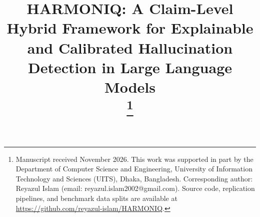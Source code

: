 \documentclass[conference]{IEEEtran}
\begin{document}
\title{HARMONIQ: A Claim-Level Hybrid Framework for Explainable and Calibrated Hallucination Detection in Large Language Models\\
\thanks{Manuscript received November 2026. This work was supported in part by the Department of Computer Science and Engineering, University of Information Technology and Sciences (UITS), Dhaka, Bangladesh. Corresponding author: Reyazul Islam (email: reyazul.islam2002@gmail.com). Source code, replication pipelines, and benchmark data splits are available at \protect\url{https://github.com/reyazul-islam/HARMONIQ}.}
}

\author{
\and
{}
\and
{}
}

\maketitle
\end{document}
